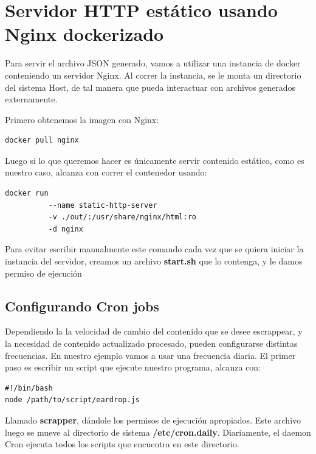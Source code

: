 \documentclass[12pt]{article}
\begin{document}
\section{Servidor HTTP estático usando Nginx dockerizado}

Para servir el archivo JSON generado, vamos a utilizar una instancia de docker conteniendo un servidor Nginx. Al correr la instancia, se le monta un directorio del sistema Host, de tal manera que pueda interactuar con archivos generados externamente.

Primero obtenemos la imagen con Nginx:

\begin{verbatim}
docker pull nginx
\end{verbatim}

Luego si lo que queremos hacer es únicamente servir contenido estático, como es nuestro caso, alcanza con correr el contenedor usando:


\begin{verbatim}
docker run 
          --name static-http-server 
          -v ./out/:/usr/share/nginx/html:ro 
          -d nginx
\end{verbatim}

Para evitar escribir manualmente este comando cada vez que se quiera iniciar la instancia del servidor, creamos un archivo \textbf{start.sh} que lo contenga, y le damos permiso de ejecución


\subsection{Configurando Cron jobs}

Dependiendo la la velocidad de cambio del contenido que se desee escrappear, y la necesidad de contenido actualizado procesado, pueden configurarse distintas frecuencias. En nuestro ejemplo vamos a usar una frecuencia diaria.
El primer paso es escribir un script que ejecute nuestro programa, alcanza con:

\begin{verbatim}
#!/bin/bash
node /path/to/script/eardrop.js
\end{verbatim}

Llamado \textbf{scrapper}, dándole los permisos de ejecución apropiados.
Este archivo luego se mueve al directorio de sistema \textbf{/etc/cron.daily}. Diariamente, el daemon Cron ejecuta todos los scripts que encuentra en este directorio. 
\end{document}

